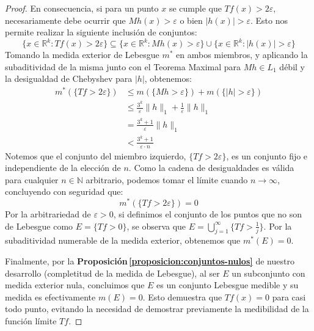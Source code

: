 \documentclass[12pt,a4paper]{article}
\theoremstyle{profesional}
\theoremstyle{definicion-style}
\begin{document}
\begin{proof}
    En consecuencia, si para un punto \(x\) se cumple que \(Tf(x) > 2\varepsilon \), necesariamente debe ocurrir que \(Mh(x) > \varepsilon \) o bien \(|h(x)| > \varepsilon \). Esto nos permite realizar la siguiente inclusión de conjuntos:
    \[
        \{x \in \mathbb{R}^k : Tf(x) > 2\varepsilon \} \subseteq \{x \in \mathbb{R}^k : Mh(x) > \varepsilon \} \cup \{x \in \mathbb{R}^k : |h(x)| > \varepsilon \}
    \]
    Tomando la medida exterior de Lebesgue \(m^*\) en ambos miembros, y aplicando la subaditividad de la misma junto con el Teorema Maximal para \( Mh \in L_1 \) débil y la desigualdad de Chebyshev para \(|h|\), obtenemos:
    \begin{align*}
        m^*(\{Tf > 2\varepsilon \}) & \le m(\{Mh > \varepsilon \}) + m(\{|h| > \varepsilon \})            \\
                                    & \le \frac{3^k}{\varepsilon} \|h\|_1 + \frac{1}{\varepsilon} \|h\|_1 \\
                                    & = \frac{3^k + 1}{\varepsilon} \|h\|_1                               \\
                                    & < \frac{3^k + 1}{\varepsilon \cdot n}
    \end{align*}
    Notemos que el conjunto del miembro izquierdo, \( \{Tf > 2\varepsilon \} \), es un conjunto fijo e independiente de la elección de \(n\). Como la cadena de desigualdades es válida para cualquier \(n \in \mathbb{N}\) arbitrario, podemos tomar el límite cuando \(n \to \infty \), concluyendo con seguridad que:
    \[
        m^*(\{Tf > 2\varepsilon \}) = 0
    \]
    Por la arbitrariedad de \(\varepsilon > 0\), si definimos el conjunto de los puntos que no son de Lebesgue como \(E = \{Tf > 0\} \), se observa que \(E = \bigcup_{j=1}^{\infty} \{Tf > \frac{1}{j}\} \). Por la subaditividad numerable de la medida exterior, obtenemos que \(m^*(E) = 0\).

    Finalmente, por la \textbf{Proposición\( \, \)\ref{proposicion:conjuntos-nulos}} de nuestro desarrollo (completitud de la medida de Lebesgue), al ser \(E\) un subconjunto con medida exterior nula, concluimos que \(E\) es un conjunto Lebesgue medible y su medida es efectivamente \(m(E) = 0\). Esto demuestra que \(Tf(x) = 0\) para casi todo punto, evitando la necesidad de demostrar previamente la medibilidad de la función límite \(Tf\).
\end{proof}
\end{document}
